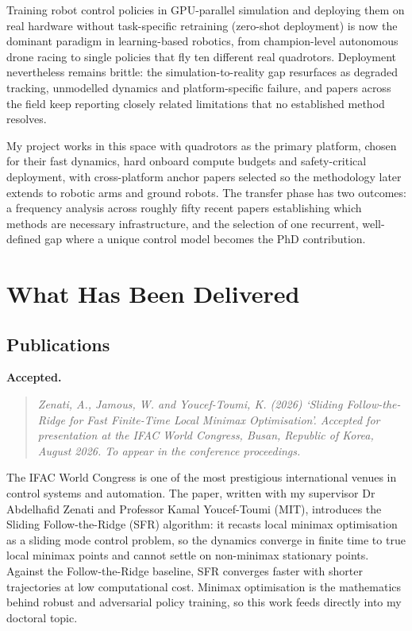 \documentclass[11pt,a4paper]{article}
\begin{document}
Training robot control policies in GPU-parallel simulation and deploying them on real hardware without task-specific retraining (zero-shot deployment) is now the dominant paradigm in learning-based robotics, from champion-level autonomous drone racing to single policies that fly ten different real quadrotors. Deployment nevertheless remains brittle: the simulation-to-reality gap resurfaces as degraded tracking, unmodelled dynamics and platform-specific failure, and papers across the field keep reporting closely related limitations that no established method resolves.

My project works in this space with quadrotors as the primary platform, chosen for their fast dynamics, hard onboard compute budgets and safety-critical deployment, with cross-platform anchor papers selected so the methodology later extends to robotic arms and ground robots. The transfer phase has two outcomes: a frequency analysis across roughly fifty recent papers establishing which methods are necessary infrastructure, and the selection of one recurrent, well-defined gap where a unique control model becomes the PhD contribution.

\section{What Has Been Delivered}

\subsection{Publications}

\textbf{Accepted.}
\begin{quote}\itshape
Zenati, A., Jamous, W. and Youcef-Toumi, K. (2026) `Sliding Follow-the-Ridge for Fast Finite-Time Local Minimax Optimisation'. Accepted for presentation at the IFAC World Congress, Busan, Republic of Korea, August 2026. To appear in the conference proceedings.
\end{quote}

The IFAC World Congress is one of the most prestigious international venues in control systems and automation. The paper, written with my supervisor Dr Abdelhafid Zenati and Professor Kamal Youcef-Toumi (MIT), introduces the Sliding Follow-the-Ridge (SFR) algorithm: it recasts local minimax optimisation as a sliding mode control problem, so the dynamics converge in finite time to true local minimax points and cannot settle on non-minimax stationary points. Against the Follow-the-Ridge baseline, SFR converges faster with shorter trajectories at low computational cost. Minimax optimisation is the mathematics behind robust and adversarial policy training, so this work feeds directly into my doctoral topic.
\end{document}
